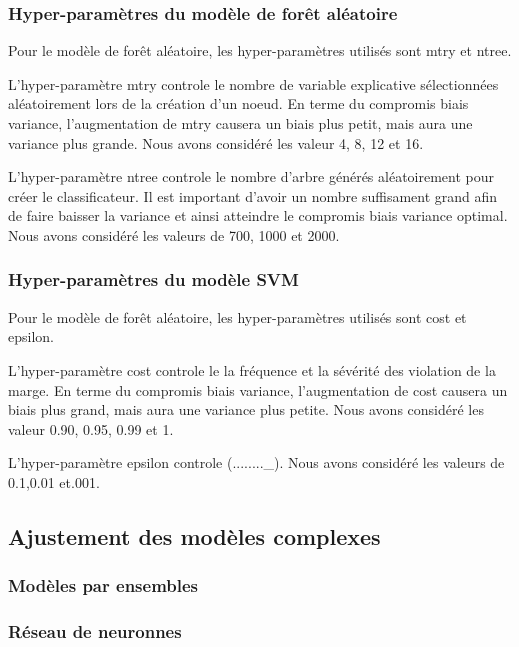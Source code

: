 \subsubsection{Hyper-paramètres du modèle de forêt aléatoire}
Pour le modèle de forêt aléatoire, les hyper-paramètres utilisés sont mtry et ntree. 

L'hyper-paramètre mtry controle le nombre de variable explicative sélectionnées aléatoirement lors de la création d'un noeud.  En terme du compromis biais variance, l'augmentation de mtry causera un biais plus petit, mais aura une variance plus grande.  Nous avons considéré les valeur 4, 8, 12 et 16.

L'hyper-paramètre ntree controle le nombre d'arbre générés aléatoirement pour créer le classificateur. Il est important d'avoir un nombre suffisament grand afin de faire baisser la variance et ainsi atteindre le compromis biais variance optimal. Nous avons considéré les valeurs de 700, 1000 et 2000. 



\subsubsection{Hyper-paramètres du modèle SVM}
Pour le modèle de forêt aléatoire, les hyper-paramètres utilisés sont cost et epsilon. 

L'hyper-paramètre cost controle le la fréquence et la sévérité des violation de la marge.  En terme du compromis biais variance, l'augmentation de cost causera un biais plus grand, mais aura une variance plus petite. Nous avons considéré les valeur 0.90, 0.95, 0.99 et 1.

L'hyper-paramètre epsilon controle (........_). Nous avons considéré les valeurs de 0.1,0.01 et.001. 


\subsection{Ajustement des modèles complexes}

\subsubsection{Modèles par ensembles}

\subsubsection{Réseau de neuronnes}

